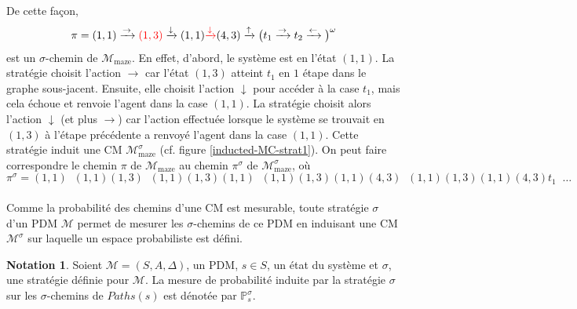 \documentclass[12pt,a4paper]{report}
\theoremstyle{definition}%
\newtheorem*{notation}{Notation}
\theoremstyle{remark}
\newcommand{\pr}{\mathbb{P}}
\begin{document}
	De cette façon, \[\pi = (1, 1) \xrightarrow{\rightarrow} {\color{red}(1, 3)}
	\xrightarrow{\downarrow} (1, 1) {\color{red} \xrightarrow{\downarrow}} (4,
	3)\xrightarrow{\uparrow} \big(t_1 \xrightarrow{\rightarrow} t_2
	\xrightarrow{\leftarrow} \big)^\omega \] est un $\sigma$-chemin de
	$\mathcal{M}_{\text{maze}}$. En effet, d'abord, le système est en l'état
	$(1,1)$. La stratégie choisit l'action $\rightarrow$ car
	l'état $(1, 3)$ atteint $t_1$ en $1$ étape dans le graphe sous-jacent.
	Ensuite, elle choisit l'action $\downarrow$ pour accéder à la case $t_1$,
	mais cela échoue et renvoie l'agent dans la case $(1,1)$. La stratégie choisit
	alors l'action $\downarrow$ (et plus $\rightarrow$) car l'action effectuée
	lorsque le système se trouvait en $(1, 3)$ à l'étape précédente a renvoyé
	l'agent dans la case $(1, 1)$.
Cette stratégie induit une CM $\mathcal{M}^\sigma_{\text{maze}}$
	(cf. figure \ref{inducted-MC-strat1}).
		On peut faire correspondre le chemin $\pi$ de
	$\mathcal{M}_{\text{maze}}$ au chemin $\pi^\sigma$
	de $\mathcal{M}^\sigma_{\text{maze}}$, où
	\[
		\pi^\sigma = (1, 1) \; \; (1, 1) (1, 3) \; \;
		(1, 1) (1, 3) (1, 1) \; \;
		(1, 1) (1, 3) (1, 1) (4, 3) \; \;
		(1, 1) (1, 3) (1, 1) (4, 3) t_1 \; \; \dots
	\] \\

Comme la probabilité des chemins d'une CM est mesurable, toute stratégie
$\sigma$ d'un PDM $\mathcal{M}$ permet de mesurer les $\sigma$-chemins de ce PDM
en induisant une CM $\mathcal{M}^\sigma$ sur laquelle un espace probabiliste
est défini.
\begin{notation}
	Soient $\mathcal{M} = (S, A, \Delta)$, un PDM, $s \in S$, un état du système et
	$\sigma$, une stratégie définie pour $\mathcal{M}$.
	La mesure de probabilité induite par la stratégie $\sigma$ sur les
	$\sigma$-chemins de $Paths(s)$ est dénotée par $\pr^\sigma_s$.
\end{notation}
\end{document}
